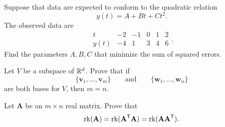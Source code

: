 \begin{problem}
Suppose that data are expected to conform to the quadratic relation
\[
y(t)=A+Bt+Ct^2.
\]
The observed data are
\[
\begin{array}{c|ccccc}
t&-2&-1&0&1&2\\ \hline
y(t)&-4&1&3&4&6
\end{array}.
\]
Find the parameters $A,B,C$ that minimize the sum of squared errors.
\end{problem}

\begin{problem}
Let $V$ be a subspace of $\mathbb{R}^d$. Prove that if
\[
\{\mathbf v_1,\dots,\mathbf v_m\}
\qquad\text{and}\qquad
\{\mathbf w_1,\dots,\mathbf w_n\}
\]
are both bases for $V$, then $m=n$.
\end{problem}

\begin{problem}
Let $\mathbf A$ be an $m\times n$ real matrix. Prove that
\[
\operatorname{rk}(\mathbf A)=\operatorname{rk}(\mathbf A^{\mathsf T}\mathbf A)=\operatorname{rk}(\mathbf A\mathbf A^{\mathsf T}).
\]
\end{problem}

